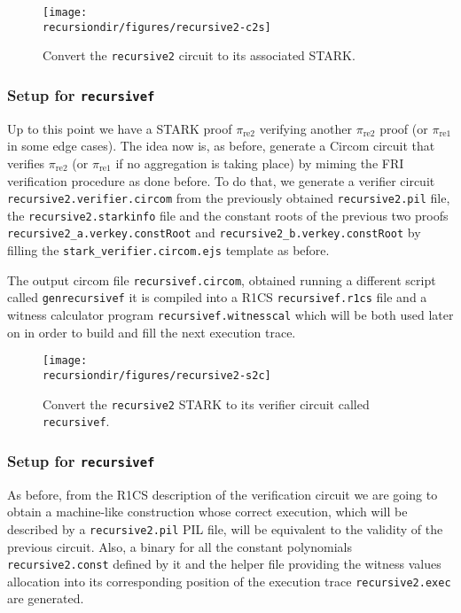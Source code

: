 \begin{figure}[H]
	\centering
	\texttt{[image: \\recursiondir/figures/recursive2-c2s]}
	\caption{Convert the \texttt{recursive2} circuit to its associated STARK.}
	\label{fig:recursive2-c2s}
\end{figure}



\subsubsection{Setup \stoc for \texttt{recursivef}}

Up to this point we have a STARK proof $\pi_{\text{re2}}$ verifying another  $\pi_{\text{re2}}$ proof (or $\pi_{\text{re1}}$ in some edge cases). The idea now is, as before, generate a Circom circuit that verifies $\pi_{\text{re2}}$ (or $\pi_{\text{re1}}$ if no aggregation is taking place) by miming the FRI verification procedure as done before. To do that, we generate a verifier circuit \texttt{recursive2.verifier.circom} from the previously obtained \texttt{recursive2.pil} file, the \texttt{recursive2.starkinfo} file and the constant roots of the previous two proofs \texttt{recursive2\_a.verkey.constRoot} and \texttt{recursive2\_b.verkey.constRoot} by filling the \texttt{stark\_verifier.circom.ejs} template as before.

The output circom file \texttt{recursivef.circom}, obtained running a different script called \texttt{genrecursivef} it is compiled into a R1CS \texttt{recursivef.r1cs} file and a witness calculator program \texttt{recursivef.witnesscal} which will be both used later on in order to build and fill the next execution trace. 

\begin{figure}[H]
\centering
\texttt{[image: \\recursiondir/figures/recursive2-s2c]}
\caption{Convert the \texttt{recursive2} STARK to its verifier circuit called \texttt{recursivef}.}
\label{fig:recursive2-s2c}
\end{figure}

\subsubsection{Setup \ctos for \texttt{recursivef}}

As before, from the R1CS description of the verification circuit we are going to obtain a machine-like construction whose correct execution, which will be described by a \texttt{recursive2.pil} PIL file, will be equivalent to the validity of the previous circuit. Also, a binary for all the constant polynomials \texttt{recursive2.const} defined by it and the helper file providing the witness values allocation into its corresponding position of the execution trace \texttt{recursive2.exec} are generated.

